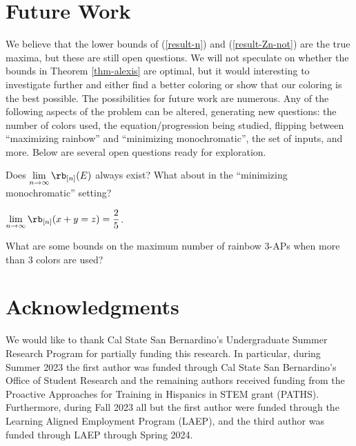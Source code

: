 \section{Future Work}
We believe that the lower bounds of (\ref{result-n}) and (\ref{result-Zn-not}) are the true maxima, but these are still open questions.
We will not speculate on whether the bounds in Theorem \ref{thm-alexis} are optimal, but it would interesting to investigate further and either find a better coloring or show that our coloring is the best possible.
The possibilities for future work are numerous.
Any of the following aspects of the problem can be altered, generating new questions:
the number of colors used, the equation/progression being studied,
flipping between ``maximizing rainbow'' and ``minimizing monochromatic'',
the set of inputs, and more.
Below are several open questions ready for exploration.
\begin{question}
Does $\displaystyle\lim_{n\to\infty}\rb_{[n]}(E)$ always exist? What about in the ``minimizing monochromatic'' setting?
\end{question}
\begin{conjecture}[\cite{TW2017}]
$\displaystyle\lim_{n\to\infty}\rb_{[n]}(x + y = z) = \frac{2}{5}$.
\end{conjecture}
\begin{question}
What are some bounds on the maximum number of rainbow 3-APs when more than 3 colors are used?
\end{question}

\section*{Acknowledgments} %
 
We would like to thank Cal State San Bernardino's 
Undergraduate Summer Research Program for partially funding 
this research. In particular, during Summer 2023 the first author was
funded through Cal State San Bernardino's Office of Student Research
and the remaining authors received funding from the
Proactive Approaches for Training in Hispanics in STEM grant (PATHS).
Furthermore, during Fall 2023 all but the first author were funded through 
the Learning Aligned Employment Program (LAEP), 
and the third author was funded  through LAEP through Spring 2024.

\newpage 

{\footnotesize

}

